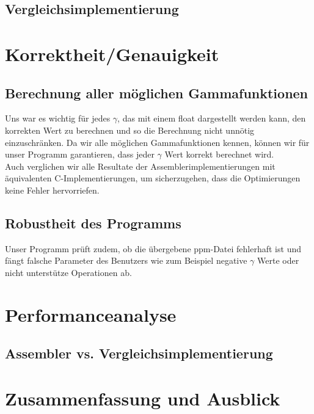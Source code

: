 \documentclass[course=erap]{aspdoc}
\begin{document}
\subsection{Vergleichsimplementierung}

\section{Korrektheit/Genauigkeit}
\subsection{Berechnung aller möglichen Gammafunktionen}
Uns war es wichtig für jedes $\gamma$, das mit einem float dargestellt werden kann, den korrekten Wert zu berechnen und so die Berechnung nicht unnötig einzuschränken. Da wir alle möglichen Gammafunktionen kennen, können wir für unser Programm garantieren, dass jeder $\gamma$ Wert korrekt berechnet wird. 
\\
Auch verglichen wir alle Resultate der Assemblerimplementierungen mit äquivalenten C-Implementierungen, um sicherzugehen, dass die Optimierungen keine Fehler hervorriefen.  
\subsection{Robustheit des Programms}
Unser Programm prüft zudem, ob die übergebene ppm-Datei fehlerhaft ist und fängt falsche Parameter des Benutzers wie zum Beispiel negative $\gamma$ Werte oder nicht unterstütze Operationen ab. 
\section{Performanceanalyse}
\subsection{Assembler vs. Vergleichsimplementierung}


\section{Zusammenfassung und Ausblick}


{}
	
\end{document}
